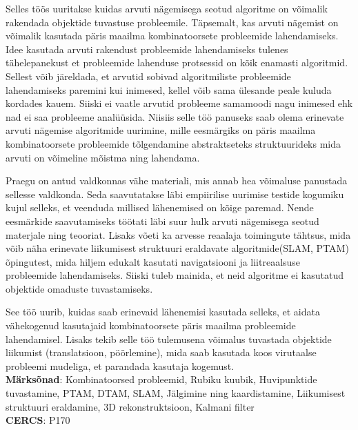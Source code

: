 \documentclass[../main]{subfiles}
\begin{document}
Selles töös uuritakse kuidas arvuti nägemisega seotud algoritme on võimalik rakendada objektide tuvastuse probleemile. Täpsemalt, kas arvuti nägemist on võimalik kasutada päris maailma kombinatoorsete probleemide lahendamiseks. Idee kasutada arvuti rakendust probleemide lahendamiseks tulenes tähelepanekust et probleemide lahenduse protsessid on kõik enamasti algoritmid. Sellest võib järeldada, et arvutid sobivad algoritmiliste probleemide lahendamiseks paremini kui inimesed, kellel võib sama ülesande peale kuluda kordades kauem. Siiski ei vaatle arvutid probleeme samamoodi nagu inimesed ehk nad ei saa probleeme analüüsida. Niisiis selle töö panuseks saab olema erinevate arvuti nägemise algoritmide uurimine, mille eesmärgiks on päris maailma kombinatoorsete probleemide tõlgendamine abstraktseteks struktuurideks mida arvuti on võimeline mõistma ning lahendama.

Praegu on antud valdkonnas vähe materiali, mis annab hea võimaluse panustada sellesse valdkonda. Seda saavutatakse läbi empiirilise uurimise testide kogumiku kujul selleks, et veenduda millised lähenemised on kõige paremad. Nende eesmärkide saavutamiseks töötati läbi suur hulk arvuti nägemisega seotud materjale ning teooriat. Lisaks võeti ka arvesse reaalaja toimingute tähtsus, mida võib näha erinevate liikumisest struktuuri eraldavate algoritmide(SLAM, PTAM) õpingutest, mida hiljem edukalt kasutati navigatsiooni ja liitreaalsuse probleemide lahendamiseks. Siiski tuleb mainida, et neid algoritme ei kasutatud objektide omaduste tuvastamiseks.

See töö uurib, kuidas saab erinevaid lähenemisi kasutada selleks, et aidata vähekogenud kasutajaid kombinatoorsete päris maailma probleemide lahendamisel. Lisaks tekib selle töö tulemusena võimalus tuvastada objektide liikumist (translatsioon, pöörlemine), mida saab kasutada koos virutaalse probleemi mudeliga, et parandada kasutaja kogemust.  \vspace{5mm} \\ \textbf{Märksõnad}: Kombinatoorsed probleemid, Rubiku kuubik, Huvipunktide tuvastamine, PTAM, DTAM, SLAM, Jälgimine ning kaardistamine, Liikumisest struktuuri eraldamine, 3D rekonstruktsioon, Kalmani filter \\
\textbf{CERCS}: P170
\end{document}
